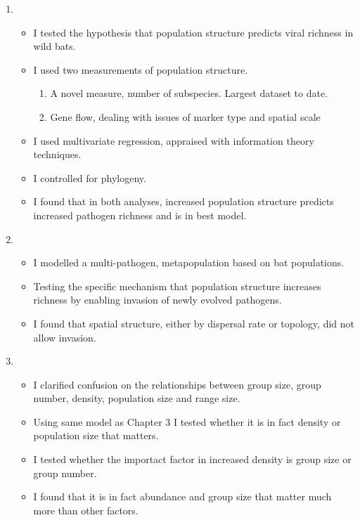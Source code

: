 \begin{enumerate}

\item
\begin{itemize}
\item I tested the hypothesis that population structure predicts viral richness in wild bats.
\item I used two measurements of population structure.
\begin{enumerate}
  \item A novel measure, number of subspecies. Largest dataset to date.
  \item Gene flow, dealing with issues of marker type and spatial scale
\end{enumerate}
\item I used multivariate regression, appraised with information theory techniques.
\item I controlled for phylogeny.
\item I found that in both analyses, increased population structure predicts increased pathogen richness and is in best model.
\end{itemize}

\item
\begin{itemize}
\item I modelled a multi-pathogen, metapopulation based on bat populations.
\item Testing the specific mechanism that population structure increases richness by enabling invasion of newly evolved pathogens.
\item I found that spatial structure, either by dispersal rate or topology, did not allow invasion.
\end{itemize}

\item
\begin{itemize}
\item I clarified confusion on the relationships between group size, group number, density, population size and range size.
\item Using same model as Chapter 3 I tested whether it is in fact density or population size that matters.
\item I tested whether the importact factor in increased density is group size or group number.
\item I found that it is in fact abundance and group size that matter much more than other factors.
\end{itemize}



\end{enumerate}
